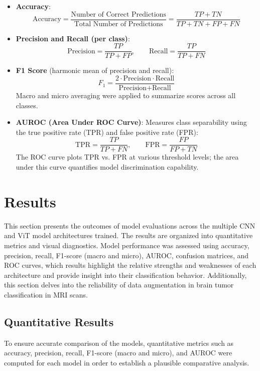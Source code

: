 \documentclass[11pt]{article}
\begin{document}
\begin{itemize}

\item \textbf{Accuracy}:
\[
\text{Accuracy} = \frac{\text{Number of Correct Predictions}}{\text{Total Number of Predictions}} = \frac{TP + TN}{TP + TN + FP + FN}
\]

\item \textbf{Precision and Recall (per class)}:
\[
\text{Precision} = \frac{TP}{TP + FP}, \qquad \text{Recall} = \frac{TP}{TP + FN}
\]

\item \textbf{F1 Score} (harmonic mean of precision and recall):
\[
F_1 = \frac{2 \cdot \text{Precision} \cdot \text{Recall}}{\text{Precision} + \text{Recall}}
\]
Macro and micro averaging were applied to summarize scores across all classes.

\item \textbf{AUROC (Area Under ROC Curve)}:
Measures class separability using the true positive rate (TPR) and false positive rate (FPR):
\[
\text{TPR} = \frac{TP}{TP + FN}, \qquad \text{FPR} = \frac{FP}{FP + TN}
\]
The ROC curve plots TPR vs. FPR at various threshold levels; the area under this curve quantifies model discrimination capability.

\end{itemize}

\section{Results}
This section presents the outcomes of model evaluations across the multiple CNN and ViT model architectures trained. The results are organized into quantitative metrics and visual diagnostics. Model performance was assessed using accuracy, precision, recall, F1-score (macro and micro), AUROC, confusion matrices, and ROC curves,  which results highlight the relative strengths and weaknesses of each architecture and provide insight into their classification behavior. Additionally, this section delves into the reliability of data augmentation in brain tumor classification in MRI scans.

\subsection*{Quantitative Results}
To ensure accurate comparison of the models, quantitative metrics such as accuracy, precision, recall, F1-score (macro and micro), and AUROC were computed for each model in order to establish a plausible comparative analysis.
\end{document}
